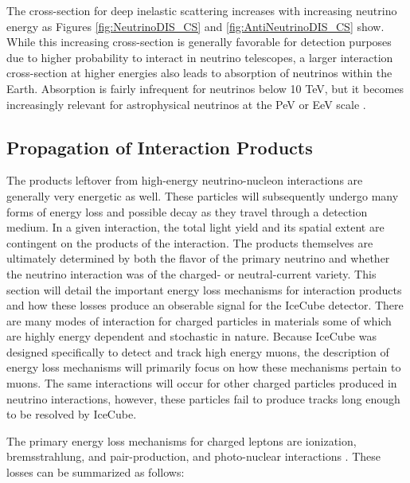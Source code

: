 \documentclass{gatech-thesis}
\begin{document}
The cross-section for deep inelastic scattering increases with increasing neutrino energy as Figures \ref{fig:NeutrinoDIS_CS} and \ref{fig:AntiNeutrinoDIS_CS} show. While this increasing cross-section is generally favorable for detection purposes due to higher probability to interact in neutrino telescopes, a larger interaction cross-section at higher energies also leads to absorption of neutrinos within the Earth. Absorption is fairly infrequent for neutrinos below 10 TeV, but it becomes increasingly relevant for astrophysical neutrinos at the PeV or EeV scale \cite{2013arXiv1304.4891K}.

\subsection{Propagation of Interaction Products}
The products leftover from high-energy neutrino-nucleon interactions are generally very energetic as well. These particles will subsequently undergo many forms of energy loss and possible decay as they travel through a detection medium. In a given interaction, the total light yield and its spatial extent are contingent on the products of the interaction. The products themselves are ultimately determined by both the flavor of the primary neutrino and whether the neutrino interaction was of the charged- or neutral-current variety. This section will detail the important energy loss mechanisms for interaction products and how these losses produce an obserable signal for the IceCube detector. There are many modes of interaction for charged particles in materials some of which are highly energy dependent and stochastic in nature. Because IceCube was designed specifically to detect and track high energy muons, the description of energy loss mechanisms will primarily focus on how these mechanisms pertain to muons. The same interactions will occur for other charged particles produced in neutrino interactions, however, these particles fail to produce tracks long enough to be resolved by IceCube.

The primary energy loss mechanisms for charged leptons are ionization, bremsstrahlung, and pair-production, and photo-nuclear interactions \cite{2001PhRvD..63i4020I}. These losses can be summarized as follows:
\end{document}
